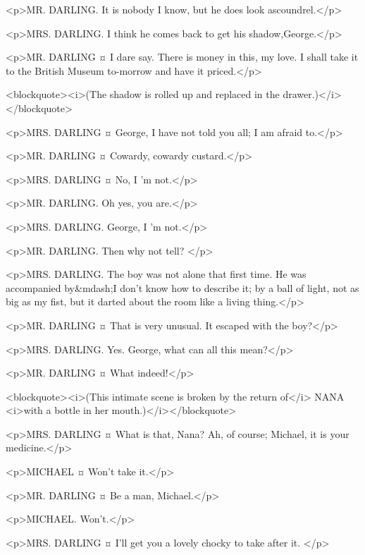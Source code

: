 <p>MR. DARLING. It is nobody I know, but he does look ascoundrel.</p>

<p>MRS. DARLING. I think he comes back to get his shadow,George.</p>

<p>MR. DARLING ¤
I dare say.
There is money in this, my love. I shall take it to the British Museum to-morrow and have it priced.</p>

<blockquote><i>(The shadow is rolled up and replaced in the drawer.)</i></blockquote>

<p>MRS. DARLING ¤
George, I have not told you all; I am afraid to.</p>

<p>MR. DARLING ¤
Cowardy, cowardy custard.</p>

<p>MRS. DARLING ¤
No, I 'm not.</p>

<p>MR. DARLING. Oh yes, you are.</p>

<p>MRS. DARLING. George, I 'm not.</p>

<p>MR. DARLING. Then why not tell?
</p>

<p>MRS. DARLING. The boy was not alone that first time. He was accompanied by&mdash;I don't know how to describe it; by a ball of light, not as big as my fist, but it darted about the room like a living thing.</p>

<p>MR. DARLING ¤
That is very unusual. It escaped with the boy?</p>

<p>MRS. DARLING. Yes.
George, what can all this mean?</p>

<p>MR. DARLING ¤
What indeed!</p>

<blockquote><i>(This intimate scene is broken by the return of</i> NANA <i>with a bottle in her mouth.)</i></blockquote>

<p>MRS. DARLING ¤
What is that, Nana? Ah, of course; Michael, it is your medicine.</p>

<p>MICHAEL ¤
Won't take it.</p>

<p>MR. DARLING ¤
Be a man, Michael.</p>

<p>MICHAEL. Won't.</p>

<p>MRS. DARLING ¤
I'll get you a lovely chocky to take after it.
</p>


